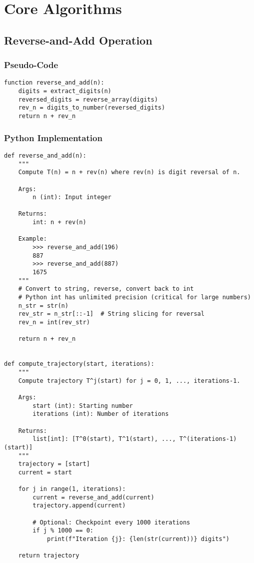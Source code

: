 \documentclass[11pt,a4paper]{article}
\begin{document}
\section{Core Algorithms}

\subsection{Reverse-and-Add Operation}

\subsubsection{Pseudo-Code}

\begin{lstlisting}[style=pseudocodestyle, caption={Reverse-and-Add Pseudo-Code}]
function reverse_and_add(n):
    digits = extract_digits(n)
    reversed_digits = reverse_array(digits)
    rev_n = digits_to_number(reversed_digits)
    return n + rev_n
\end{lstlisting}

\subsubsection{Python Implementation}

\begin{lstlisting}[style=pythonstyle, caption={Reverse-and-Add Implementation}]
def reverse_and_add(n):
    """
    Compute T(n) = n + rev(n) where rev(n) is digit reversal of n.
    
    Args:
        n (int): Input integer
        
    Returns:
        int: n + rev(n)
    
    Example:
        >>> reverse_and_add(196)
        887
        >>> reverse_and_add(887)
        1675
    """
    # Convert to string, reverse, convert back to int
    # Python int has unlimited precision (critical for large numbers)
    n_str = str(n)
    rev_str = n_str[::-1]  # String slicing for reversal
    rev_n = int(rev_str)
    
    return n + rev_n


def compute_trajectory(start, iterations):
    """
    Compute trajectory T^j(start) for j = 0, 1, ..., iterations-1.
    
    Args:
        start (int): Starting number
        iterations (int): Number of iterations
        
    Returns:
        list[int]: [T^0(start), T^1(start), ..., T^(iterations-1)(start)]
    """
    trajectory = [start]
    current = start
    
    for j in range(1, iterations):
        current = reverse_and_add(current)
        trajectory.append(current)
        
        # Optional: Checkpoint every 1000 iterations
        if j % 1000 == 0:
            print(f"Iteration {j}: {len(str(current))} digits")
    
    return trajectory
\end{lstlisting}
\end{document}
